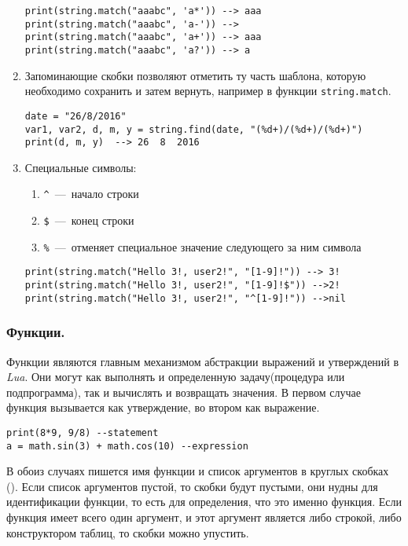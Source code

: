 \begin{enumerate}
\begin{lstlisting}
print(string.match("aaabc", 'a*')) --> aaa
print(string.match("aaabc", 'a-')) --> 
print(string.match("aaabc", 'a+')) --> aaa
print(string.match("aaabc", 'a?')) --> a
\end{lstlisting}
	
	\item Запоминающие скобки позволяют отметить ту часть шаблона, которую необходимо сохранить и затем вернуть, например в функции \lstinline{string.match}.

\begin{lstlisting}
date = "26/8/2016"
var1, var2, d, m, y = string.find(date, "(%d+)/(%d+)/(%d+)")
print(d, m, y)  --> 26  8  2016
\end{lstlisting}

	\item Специальные символы:
			\begin{enumerate}
				\item \lstinline{^}~---~начало строки
				\item \lstinline{$}~---~конец строки
				\item \lstinline{%}~---~отменяет специальное значение следующего за ним символа
			\end{enumerate}

\begin{lstlisting}
print(string.match("Hello 3!, user2!", "[1-9]!")) --> 3!
print(string.match("Hello 3!, user2!", "[1-9]!$")) -->2!
print(string.match("Hello 3!, user2!", "^[1-9]!")) -->nil
\end{lstlisting}

\end{enumerate}

\subsubsection{Функции.}
Функции являются главным механизмом абстракции выражений и утверждений в \emph{Lua}. Они могут как выполнять и определенную задачу(процедура или подпрограмма), так и вычислять и возвращать значения. В первом случае функция вызывается как утверждение, во втором как выражение. 

\begin{lstlisting}
print(8*9, 9/8) --statement
a = math.sin(3) + math.cos(10) --expression
\end{lstlisting}

В обоиз случаях пишется имя функции и список аргументов в круглых скобках (). Если список аргументов пустой, то скобки будут пустыми, они нудны для идентификации функции, то есть для определения, что это именно функция. Если функция имеет всего один аргумент, и этот аргумент является либо строкой, либо конструктором таблиц, то скобки можно упустить.

